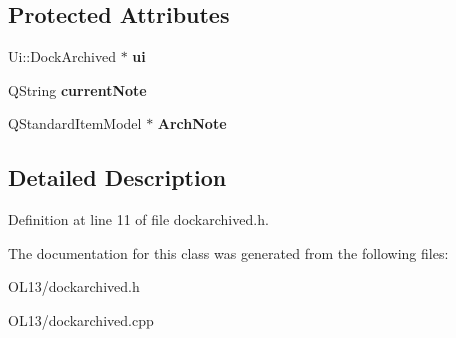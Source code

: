 \subsection*{Protected Attributes}
\begin{DoxyCompactItemize}
\item 
\mbox{\label{class_dock_a525f557d9a2670640105da2f1e605026}} 
Ui\+::\+Dock\+Archived $\ast$ {\bfseries ui}
\item 
\mbox{\label{class_dock_a6af86621e3df52266a582e464324e6d2}} 
Q\+String {\bfseries current\+Note}
\item 
\mbox{\label{class_dock_a484517393b214e1c3abe0c7b36596172}} 
Q\+Standard\+Item\+Model $\ast$ {\bfseries Arch\+Note}
\end{DoxyCompactItemize}


\subsection{Detailed Description}


Definition at line 11 of file dockarchived.\+h.



The documentation for this class was generated from the following files\+:\begin{DoxyCompactItemize}
\item 
O\+L13/dockarchived.\+h\item 
O\+L13/dockarchived.\+cpp\end{DoxyCompactItemize}
